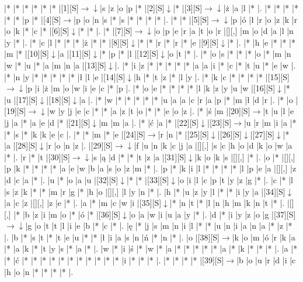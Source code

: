 \documentclass[11pt]{article}
\newcommand\drarr{$\rightarrow \!\!\!\!\! \downarrow$}
\newcommand\rarr{$\rightarrow$}
\newcommand\darr{$\downarrow$}
\begin{document}
\noindent\begin{Puzzle}{18}{31}|*	|*	|*	|*	|*	|*	|[1][S]\drarr	|s	|z	|o	|p	|*	|[2][S]\darr	|*	|[3][S]\drarr	|ż	|a	|l	|*	|.
|*	|*	|*	|*	|*	|*	|p	|*	|[4][S]\rarr	|p	|o	|n	|s	|*	|s	|*	|*	|*	|*	|.
|*	|*	|[5][S]\drarr	|p	|ó	|ł	|r	|o	|z	|k	|r	|o	|k	|*	|c	|*	|[6][S]\darr	|*	|*	|.
|*	|[7][S]\drarr	|o	|p	|e	|r	|a	|t	|o	|r	|[][,]{ }	|m	|o	|d	|a	|l	|n	|y	|*	|.
|*	|c	|l	|*	|*	|*	|ż	|*	|*	|[8][S]\darr	|*	|*	|r	|*	|r	|*	|e	|[9][S]\darr	|*	|.
|*	|h	|e	|*	|*	|*	|m	|*	|[10][S]\darr	|a	|[11][S]\darr	|*	|p	|*	|l	|[12][S]\darr	|o	|t	|*	|.
|*	|o	|s	|*	|*	|*	|o	|*	|m	|n	|w	|*	|u	|*	|a	|m	|n	|a	|[13][S]\darr	|.
|*	|i	|z	|*	|*	|*	|*	|*	|a	|a	|i	|*	|c	|*	|t	|u	|*	|e	|w	|.
|*	|n	|y	|*	|*	|*	|*	|*	|ł	|l	|e	|[14][S]\darr	|h	|*	|t	|z	|*	|l	|y	|.
|*	|k	|c	|*	|*	|*	|*	|[15][S]\drarr	|p	|i	|ż	|m	|o	|w	|i	|e	|c	|*	|p	|.
|*	|o	|e	|*	|*	|*	|*	|l	|k	|z	|y	|u	|w	|[16][S]\darr	|*	|u	|[17][S]\darr	|[18][S]\darr	|a	|.
|*	|w	|*	|*	|*	|*	|*	|u	|a	|a	|c	|r	|a	|p	|*	|m	|ł	|d	|r	|.
|*	|o	|[19][S]\drarr	|w	|y	|j	|e	|c	|*	|*	|a	|z	|t	|o	|*	|*	|e	|o	|z	|.
|*	|ś	|m	|[20][S]\rarr	|t	|u	|l	|e	|j	|a	|*	|a	|e	|d	|*	|[21][S]\darr	|m	|m	|a	|.
|*	|ć	|a	|*	|[22][S]\darr	|[23][S]\rarr	|u	|r	|m	|i	|a	|*	|*	|s	|*	|k	|k	|e	|c	|.
|*	|*	|m	|*	|e	|[24][S]\rarr	|r	|n	|*	|[25][S]\darr	|[26][S]\darr	|[27][S]\darr	|*	|a	|[28][S]\darr	|r	|o	|n	|z	|.
|[29][S]\drarr	|f	|u	|n	|k	|c	|j	|a	|[][,]{ }	|s	|c	|h	|o	|d	|k	|o	|w	|a	|*	|.
|r	|*	|t	|[30][S]\drarr	|s	|ą	|d	|*	|*	|t	|z	|a	|[31][S]\darr	|k	|o	|k	|s	|[][,]{ }	|*	|.
|o	|*	|[][,]{ }	|p	|k	|*	|*	|*	|*	|a	|e	|w	|b	|a	|s	|o	|z	|m	|*	|.
|p	|*	|k	|i	|l	|*	|*	|*	|*	|l	|p	|e	|a	|[][,]{ }	|z	|d	|c	|a	|*	|.
|u	|*	|o	|a	|u	|[32][S]\darr	|*	|*	|[33][S]\darr	|o	|i	|l	|c	|p	|t	|y	|z	|g	|*	|.
|c	|*	|l	|s	|z	|k	|*	|*	|m	|r	|g	|*	|h	|o	|[][,]{ }	|l	|y	|n	|*	|.
|h	|*	|u	|z	|y	|l	|*	|*	|i	|y	|a	|[34][S]\darr	|a	|c	|z	|[][,]{ }	|z	|e	|*	|.
|a	|*	|m	|c	|w	|i	|[35][S]\darr	|*	|n	|t	|*	|l	|n	|h	|m	|k	|n	|t	|*	|.
|[][,]{ }	|*	|b	|z	|i	|m	|o	|*	|ó	|*	|[36][S]\darr	|o	|a	|w	|i	|u	|a	|y	|*	|.
|d	|*	|i	|y	|z	|o	|g	|[37][S]\drarr	|g	|o	|t	|t	|l	|i	|e	|b	|*	|c	|*	|.
|ę	|*	|j	|s	|m	|n	|i	|l	|*	|*	|u	|n	|i	|a	|n	|a	|*	|z	|*	|.
|b	|*	|s	|t	|*	|t	|e	|u	|*	|*	|ł	|i	|a	|s	|n	|ń	|*	|n	|*	|.
|o	|[38][S]\rarr	|k	|o	|m	|ó	|r	|k	|a	|*	|a	|k	|*	|t	|y	|s	|*	|a	|*	|.
|w	|*	|i	|ś	|*	|w	|*	|a	|*	|*	|*	|*	|*	|a	|*	|k	|*	|*	|*	|.
|a	|*	|*	|ć	|*	|*	|*	|*	|*	|*	|*	|*	|*	|*	|*	|i	|*	|*	|*	|.
|*	|*	|*	|*	|[39][S]\rarr	|b	|o	|u	|r	|d	|i	|c	|h	|o	|n	|*	|*	|*	|*	|.\end{Puzzle}

\newpage
\end{document}
